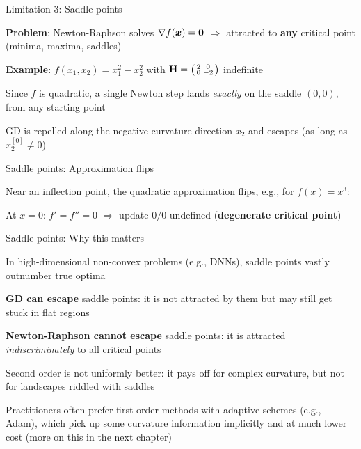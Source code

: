 \documentclass[11pt,compress,t,notes=noshow, xcolor=table]{beamer}
\begin{document}
\begin{framei}{Limitation 3: Saddle points}
\item \textbf{Problem}: Newton-Raphson solves $\nabla f(\bm{x}) = \mathbf{0}$ $\Rightarrow$ attracted to \textbf{any}
critical point (minima, maxima, saddles)
\item \textbf{Example}: $f(x_1, x_2) = x_1^2 - x_2^2$ with $\mathbf{H} = \left(\begin{smallmatrix} 2 & 0 \\ 0 & -2 \end{smallmatrix}\right)$
indefinite
\begin{itemizeS}
\item Since $f$ is quadratic, a single Newton step lands \textit{exactly} on the saddle $(0,0)$, from any starting point
\item GD is repelled along the negative curvature direction $x_2$ and escapes (as long as $x_2^{[0]} \neq 0$)
\end{itemizeS}
\end{framei}

\begin{framei}{Saddle points: Approximation flips}
\item Near an inflection point, the quadratic approximation flips, e.g., for $f(x) = x^3$:
\item At $x = 0$: $f'= f''= 0$ $\Rightarrow$ update $0/0$ undefined (\textbf{degenerate critical point})
\end{framei}


\begin{framei}{Saddle points: Why this matters}
\item In high-dimensional non-convex problems (e.g., DNNs), saddle points vastly outnumber true optima
\item \textbf{GD can escape} saddle points: it is not attracted by them but may still get stuck in flat regions
\item \textbf{Newton-Raphson cannot escape} saddle points: it is attracted \textit{indiscriminately} to all critical points
\item Second order is not uniformly better: it pays off for complex curvature, but not for
landscapes riddled with saddles
\item Practitioners often prefer first order methods with adaptive schemes (e.g., Adam), which pick up
some curvature information implicitly and at much lower cost (more on this in the next chapter)
\end{framei}
\end{document}
